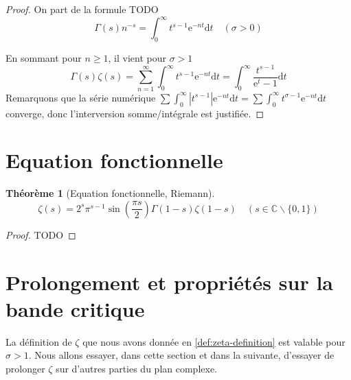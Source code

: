 \documentclass[french]{report}
\newtheorem{theorem}{Théorème}[section]
\begin{document}
\begin{proof}
  On part de la formule TODO
  \[ \Gamma(s)n^{-s} = \int_0^\infty t^{s-1}\mathrm{e}^{-nt}\mathrm{d}t\quad (\sigma > 0) \]

  En sommant pour $n\geq1$, il vient pour $\sigma>1$
  \[ \Gamma(s)\zeta(s) = \sum_{n=1}^\infty\int_0^\infty t^{s-1}\mathrm{e}^{-nt}\mathrm{d}t = \int_0^\infty \frac{t^{s-1}}{\mathrm{e}^t - 1}\mathrm{d}t \]
  Remarquons que la série numérique $\sum\int_0^\infty |t^{s-1}|\mathrm{e}^{-nt}\mathrm{d}t = \sum\int_0^\infty t^{\sigma-1}\mathrm{e}^{-nt}\mathrm{d}t$ converge, donc l'interversion somme/intégrale est justifiée.
\end{proof}

\section{Equation fonctionnelle}

\begin{theorem}[Equation fonctionnelle, Riemann]\label{thm:equation-fonctionnelle}
  \[ \zeta(s) = 2^s\pi^{s-1}\sin\left(\frac{\pi s}{2}\right)\Gamma(1-s)\zeta(1-s)\quad (s\in\mathbb{C}\backslash\{0,1\})\]
\end{theorem}

\begin{proof}
  TODO
\end{proof}

\section{Prolongement et propriétés sur la bande critique}

La définition de $\zeta$ que nous avons donnée en \ref{def:zeta-definition} est valable pour $\sigma>1$. Nous allons essayer, dans cette section et dans la suivante, d'essayer de prolonger $\zeta$ sur d'autres parties du plan complexe. \\
\end{document}
